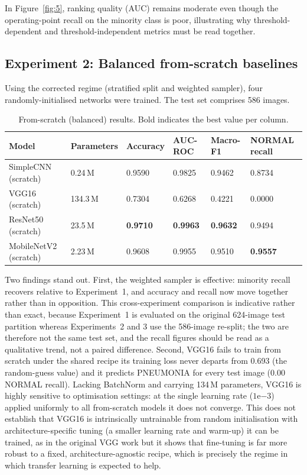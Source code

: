 \documentclass[11pt,a4paper]{article}
\numberwithin{figure}{section}
\numberwithin{table}{section}
\begin{document}
In Figure~\ref{fig:5}, ranking quality (AUC) remains moderate even though the operating-point recall on
the minority class is poor, illustrating why threshold-dependent and threshold-independent metrics must
be read together.

\subsection{Experiment 2: Balanced from-scratch baselines}
Using the corrected regime (stratified split and weighted sampler), four randomly-initialised networks
were trained. The test set comprises 586 images.

\begin{table}[H]
\centering
\caption{From-scratch (balanced) results. Bold indicates the best value per column.}
\label{tab:exp2}
\setlength{\tabcolsep}{4pt}
\begin{tabular}{L{34mm} C{20mm} C{18mm} C{17mm} C{17mm} C{20mm}}
\toprule
Model & Parameters & Accuracy & AUC-ROC & Macro-F1 & NORMAL recall \\
\midrule
SimpleCNN (scratch) & 0.24\,M & 0.9590 & 0.9825 & 0.9462 & 0.8734 \\
VGG16 (scratch) & 134.3\,M & 0.7304 & 0.6268 & 0.4221 & 0.0000 \\
ResNet50 (scratch) & 23.5\,M & \textbf{0.9710} & \textbf{0.9963} & \textbf{0.9632} & 0.9494 \\
MobileNetV2 (scratch) & 2.23\,M & 0.9608 & 0.9955 & 0.9510 & \textbf{0.9557} \\
\bottomrule
\end{tabular}
\end{table}

Two findings stand out. First, the weighted sampler is effective: minority recall recovers relative to
Experiment~1, and accuracy and recall now move together rather than in opposition. This cross-experiment
comparison is indicative rather than exact, because Experiment~1 is evaluated on the original 624-image
test partition whereas Experiments~2 and 3 use the 586-image re-split; the two are therefore not the same
test set, and the recall figures should be read as a qualitative trend, not a paired difference. Second,
VGG16 fails to train from scratch under the shared recipe its training loss never departs from 0.693
(the random-guess value) and it predicts PNEUMONIA for every test image (0.00 NORMAL recall). Lacking
BatchNorm and carrying 134\,M parameters, VGG16 is highly sensitive to optimisation settings: at the
single learning rate ($1\mathrm{e}{-3}$) applied uniformly to all from-scratch models it does not
converge. This does not establish that VGG16 is intrinsically untrainable from random
initialisation with architecture-specific tuning (a smaller learning rate and warm-up) it can be
trained, as in the original VGG work but it shows that fine-tuning is far more robust to a fixed,
architecture-agnostic recipe, which is precisely the regime in which transfer learning is expected to
help.
\end{document}
